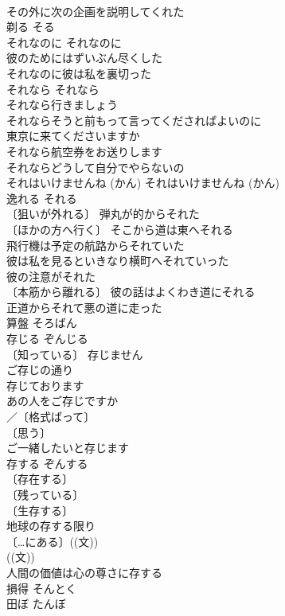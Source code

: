 \documentclass[8pt]{extreport}
\begin{document}
\begin{CJK}{UTF8}{min}
\\	その外に次の企画を説明してくれた 
\\	剃る	そる	
\\	それなのに	それなのに	
\\	彼のためにはずいぶん尽くした
\\	それなのに彼は私を裏切った 
\\	それなら	それなら	
\\	それなら行きましょう 
\\	それならそうと前もって言ってくださればよいのに 
\\	東京に来てくださいますか
\\	それなら航空券をお送りします 
\\	それならどうして自分でやらないの 
\\	それはいけませんね (かん)	それはいけませんね (かん)	
\\	逸れる	それる	
\\	〔狙いが外れる〕 弾丸が的からそれた 
\\	〔ほかの方へ行く〕 そこから道は東へそれる 
\\	飛行機は予定の航路からそれていた 
\\	彼は私を見るといきなり横町へそれていった 
\\	彼の注意がそれた 
\\	〔本筋から離れる〕 彼の話はよくわき道にそれる 
\\	正道からそれて悪の道に走った 
\\	算盤	そろばん	
\\	存じる	ぞんじる	
\\	〔知っている〕 存じません 
\\	ご存じの通り 
\\	存じております 
\\	あの人をご存じですか 
\\	／〔格式ばって〕
\\	〔思う〕
\\	ご一緒したいと存じます 
\\	存する	ぞんする	
\\	〔存在する〕
\\	〔残っている〕
\\	〔生存する〕
\\	地球の存する限り 
\\	〔…にある〕((文)) 
\\	((文)) 
\\	人間の価値は心の尊さに存する 
\\	損得	そんとく	
\\	田ぼ	たんぼ	

\end{CJK}
\end{document}
